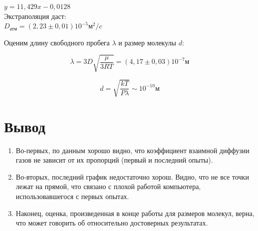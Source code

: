 \documentclass[12pt]{article}
\begin{document}
		\vspace{2cm}
		\begin{minipage}{0.5\textwidth}
		\end{minipage}	
		\hspace{0.5cm}
		\begin{minipage}{0.5\textwidth}
			\centering 
			$y=11,429x - 0,0128$\\
			Экстраполяция даст:\\
			$D_{\textit{атм}} = (2,23 \pm 0,01) 10^{-5} \textit{м}^2/c$		
			
		\end{minipage}
		
		
		Оценим длину свободного пробега $\lambda$ и размер молекулы $d$:
		
		\begin{equation*}
		\lambda = 3D\sqrt{\dfrac{\mu}{3RT}} = (4,17 \pm 0,03) 10^{-7} \textit{м} 
		\end{equation*}
		
		\begin{equation*}
		d = \sqrt{\dfrac{kT}{P\lambda}} \sim 10^{-10} \textit{м} 
		\end{equation*}	
		
		\section*{Вывод}
		\begin{enumerate}
			\item Во-первых, по данным хорошо видно, что коэффициент взаимной диффузии газов не зависит от их пропорций (первый и последний опыты).
			\item Во-вторых, последний график недостаточно хорош. Видно, что не все точки лежат на прямой, что связано с плохой работой компьютера, использовавшегося с первых опытах.
			\item Наконец, оценка, произведенная в конце работы для размеров молекул, верна, что может говорить об относительно достоверных результатах.
		\end{enumerate}
		
\end{document}

